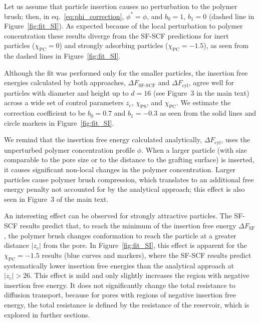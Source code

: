 \documentclass[10pt, a4paper]{article}
\begin{document}
\begin{multicols}{2}
Let us assume that particle insertion causes no perturbation to the polymer brush; then, in eq.~\ref{eq:phi_correction}, $\phi^{\ast} = \phi$, and $b_0 = 1$, $b_1 = 0$ (dashed line in Figure~\ref{fig:fit_SI}).
As expected because of the local perturbation to polymer concentration these results diverge from the SF-SCF predictions for inert particles ($\chi_{\textrm{PC}} = 0$) and strongly adsorbing particles ($\chi_{\textrm{PC}} = -1.5$), as seen from the dashed lines in Figure~\ref{fig:fit_SI}.


Although the fit was performed only for the smaller particles, the insertion free energies calculated by both approaches, $\Delta F_{\textrm{SF-SCF}}$ and $\Delta F_{\textrm{cyl}}$, agree well for particles with diameter and height up to $d = 16$ (see Figure~3 in the main text) across a wide set of control parameters $z_c$, $\chi_{\textrm{PS}}$, and $\chi_{\textrm{PC}}$.
We estimate the correction coefficient to be $b_0=0.7$ and $b_1 = -0.3$ as seen from the solid lines and circle markers in Figure~\ref{fig:fit_SI}.

We remind that the insertion free energy calculated analytically, $\Delta F_{\textrm{cyl}}$, uses the unperturbed polymer concentration profile $\phi$.
When a larger particle (with size comparable to the pore size or to the distance to the grafting surface) is inserted, it causes significant non-local changes in the polymer concentration.
Larger particles cause polymer brush compression, which translates to an additional free energy penalty not accounted for by the analytical approach; this effect is also seen in Figure~3 of the main text.


An interesting effect can be observed for strongly attractive particles.
The SF-SCF results predict that, to reach the minimum of the insertion free energy $\Delta F_{\textrm{SF}}$, the polymer brush changes conformation to reach the particle at a greater distance $|z_c|$ from the pore.
In Figure~\ref{fig:fit_SI}, this effect is apparent for the $\chi_{\textrm{PC}} = -1.5$ results (blue curves and markers), where the SF-SCF results predict systematically lower insertion free energies than the analytical approach at $|z_c| > 26$.
This effect is mild and only slightly increases the region with negative insertion free energy.
It does not significantly change the total resistance to diffusion transport, because for pores with regions of negative insertion free energy, the total resistance is defined by the resistance of the reservoir, which is explored in further sections.


\end{multicols}
\end{document}
